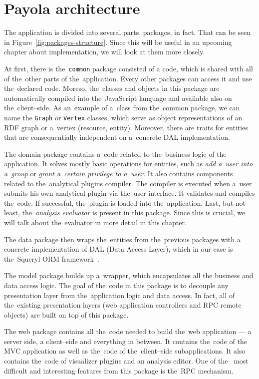 \section{Payola architecture}
The application is divided into several parts, packages, in fact. That can be 
seen in Figure~\ref{fig:packages-structure}. Since this will be useful in an upcoming
chapter about implementation, we will look at them more closely.

At first, there is the~\texttt{common} package consisted of a code, which is 
shared with all of the~other parts of the~application. Every other packages can 
access it and use the~declared code. Moreso, the~classes and objects 
in this package are automatically compiled into the~JavaScript language and available
also on the~client--side. As an~example of a~class from the~common package, we
can name the \texttt{Graph} or \texttt{Vertex} classes, which serve as object representations
of an RDF graph or a~vertex (resource, entity). Moreover, there are traits for 
entities that are consequentially independent on a~concrete DAL implementation.

The domain package contains a~code related to the~business logic of the~
application. It solves mostly basic operations for entities, such as
\emph{add a~user into a~group} or \emph{grant a~certain privilege to a~user}.
It also contains components related to the~analytical plugins compiler. The 
compiler is executed when a~user submits his own analytical plugin via the~user 
interface. It validates and compiles the~code. If successful, the~plugin is 
loaded into the~application. Last, but not least, the~\emph{analysis evaluator} is 
present in this package. Since this is crucial, we will talk about the~evaluator
in more detail in this chapter.

The data package then wraps the~entities from the~previous packages with a
concrete implementation of DAL (Data Access Layer), which in our case is the~Squeryl
ORM framework~\cite{squeryl}.

The model package builds up a~wrapper, which encapsulates all the
business and data access logic. The goal of the~code in this package is to decouple
any presentation layer from the~application logic and data access. In fact,
all of the~existing presentation layers (web application controllers and
RPC remote objects) are built on top of this package. 

The web package contains all the~code needed to build the~web application --- 
a server side, a client--side and everything in between. It contains the~code of 
the MVC application as well as the~code of the~client--side subapplications.
It also contains the~code of visualizer plugins and an analysis editor. One of the~
most difficult and interesting features from this package is the~RPC mechanism.

